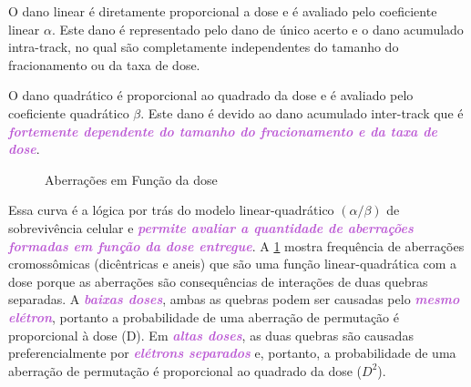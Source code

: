 \documentclass[11pt,a4paper]{article}
\begin{document}
	O dano linear é diretamente proporcional a dose e é avaliado pelo coeficiente linear $\alpha$. Este dano é representado pelo dano de único acerto e o dano acumulado intra-track, no qual são completamente independentes do tamanho do fracionamento ou da taxa de dose. 

	O dano quadrático é proporcional ao quadrado da dose e é avaliado pelo coeficiente quadrático $\beta$.  Este dano é devido ao dano acumulado inter-track que é \textcolor{MediumOrchid}{\textbf{\textit{fortemente dependente do tamanho do fracionamento e da taxa de dose}}}.

	\begin{figure}[h]
		\centering
		\caption{Aberrações em Função da dose}
		\label{fig:aberracaoEDose}
	\end{figure}

	Essa curva é a lógica por trás do modelo linear-quadrático $(\alpha/\beta)$ de sobrevivência celular e \textcolor{MediumOrchid}{\textbf{\textit{permite avaliar a quantidade de aberrações formadas em função da dose entregue}}}. A \ref{fig:aberracaoEDose} mostra frequência de aberrações cromossômicas (dicêntricas e aneis) que são uma função linear-quadrática com a dose porque as aberrações são consequências de interações de duas quebras separadas. A \textcolor{MediumOrchid}{\textbf{\textit{baixas doses}}}, ambas as quebras podem ser causadas pelo \textcolor{MediumOrchid}{\textbf{\textit{mesmo elétron}}}, portanto a probabilidade de uma aberração de permutação é proporcional à dose (D). Em \textcolor{MediumOrchid}{\textbf{\textit{altas doses}}}, as duas quebras são causadas preferencialmente por \textcolor{MediumOrchid}{\textbf{\textit{elétrons separados}}} e, portanto, a probabilidade de uma aberração de permutação é proporcional ao quadrado da dose ($D^2$).
\end{document}
